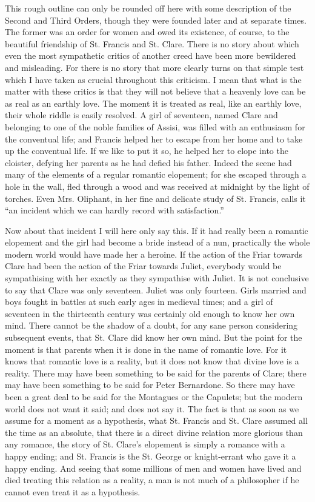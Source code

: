 \documentclass{book}
\begin{document}
This rough outline can only be rounded off here with some description of the Second and Third Orders, though they were founded later and at separate times. The former was an order for women and owed its existence, of course, to the beautiful friendship of St. Francis and St. Clare. There is no story about which even the most sympathetic critics of another creed have been more bewildered and misleading. For there is no story that more clearly turns on that simple test which I have taken as crucial throughout this criticism. I mean that what is the matter with these critics is that they will not believe that a heavenly love can be as real as an earthly love. The moment it is treated as real, like an earthly love, their whole riddle is easily resolved. A girl of seventeen, named Clare and belonging to one of the noble families of Assisi, was filled with an enthusiasm for the conventual life; and Francis helped her to escape from her home and to take up the conventual life. If we like to put it so, he helped her to elope into the cloister, defying her parents as he had defied his father. Indeed the scene had many of the elements of a regular romantic elopement; for she escaped through a hole in the wall, fled through a wood and was received at midnight by the light of torches. Even Mrs. Oliphant, in her fine and delicate study of St. Francis, calls it “an incident which we can hardly record with satisfaction.”

Now about that incident I will here only say this. If it had really been a romantic elopement and the girl had become a bride instead of a nun, practically the whole modern world would have made her a heroine. If the action of the Friar towards Clare had been the action of the Friar towards Juliet, everybody would be sympathising with her exactly as they sympathise with Juliet. It is not conclusive to say that Clare was only seventeen. Juliet was only fourteen. Girls married and boys fought in battles at such early ages in medieval times; and a girl of seventeen in the thirteenth century was certainly old enough to know her own mind. There cannot be the shadow of a doubt, for any sane person considering subsequent events, that St. Clare did know her own mind. But the point for the moment is that parents when it is done in the name of romantic love. For it knows that romantic love is a reality, but it does not know that divine love is a reality. There may have been something to be said for the parents of Clare; there may have been something to be said for Peter Bernardone. So there may have been a great deal to be said for the Montagues or the Capulets; but the modern world does not want it said; and does not say it. The fact is that as soon as we assume for a moment as a hypothesis, what St. Francis and St. Clare assumed all the time as an absolute, that there is a direct divine relation more glorious than any romance, the story of St. Clare’s elopement is simply a romance with a happy ending; and St. Francis is the St. George or knight-errant who gave it a happy ending. And seeing that some millions of men and women have lived and died treating this relation as a reality, a man is not much of a philosopher if he cannot even treat it as a hypothesis.
\end{document}
